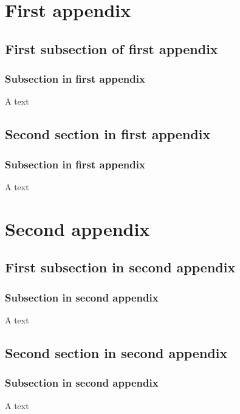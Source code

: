 \documentclass[10pt,oneside,english]{lips}
\begin{document}
\clearpage


\cleardoublepage
\appendix
\section{First appendix}
\subsection{First subsection of first appendix}
\lipsum[5]

\subsubsection{Subsection in first appendix}
A text

\subsection{Second section in first appendix}
\lipsum[5]
\subsubsection{Subsection in first appendix}
A text

\section{Second appendix}
\subsection{First subsection in second appendix}
\lipsum[5]

\subsubsection{Subsection in second appendix}
A text

\subsection{Second section in second appendix}
\lipsum[5]
\subsubsection{Subsection in second appendix}
A text
\end{document}
